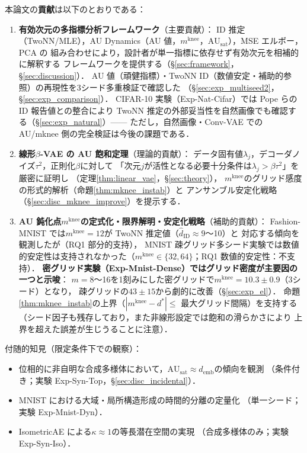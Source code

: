 \documentclass[11pt,a4paper]{jsarticle}
\newcommand{\kap}{\kappa}
\newcommand{\AUsat}{\mathrm{AU}_{\mathrm{sat}}}
\newcommand{\mknee}{m^{\mathrm{knee}}}
\newcommand{\demb}{d_{\mathrm{emb}}}
\begin{document}
本論文の\textbf{貢献}は以下のとおりである：
\begin{enumerate}
  \item \textbf{有効次元の多指標分析フレームワーク}（主要貢献）：
        ID 推定（TwoNN/MLE），AU Dynamics（AU 値，$\mknee$，$\AUsat$），MSE エルボー，PCA の
        組み合わせにより，設計者が単一指標に依存せず有効次元を相補的に解釈する
        フレームワークを提供する（§\ref{sec:framework}，§\ref{sec:discussion}）．
        AU 値（頑健指標）・TwoNN ID（数値安定・補助的参照）の再現性を3シード多重検証で確認した
        （§\ref{sec:exp_multiseed2}，§\ref{sec:exp_comparison}）．
        CIFAR-10 実験（Exp-Nat-Cifar）では Pope ら\cite{pope2021intrinsic}の ID 報告値との整合により
        TwoNN 推定の外部妥当性を自然画像でも確認する（§\ref{sec:exp_natural}）——
        ただし，自然画像・Conv-VAE での AU/mknee 側の完全検証は今後の課題である．
  \item \textbf{線形$\beta$-VAE の AU 飽和定理}（理論的貢献）：
        データ固有値$\lambda_j$，デコーダノイズ$\tau^2$，正則化$\beta$に対して
        「次元$j$が活性となる必要十分条件は$\lambda_j > \beta\tau^2$」を厳密に証明し
        （定理\ref{thm:linear_vae}，§\ref{sec:theory}），
        $\mknee$のグリッド感度の形式的解析（命題\ref{thm:mknee_instab}）と
        アンサンブル安定化戦略（§\ref{sec:disc_mknee_improve}）を提示する．
  \item \textbf{AU 鈍化点$\mknee$の定式化・限界解明・安定化戦略}（補助的貢献）：
        Fashion-MNIST では$\mknee = 12$が TwoNN 推定値（$\hat{d}_\mathrm{ID} \approx 9$〜10）と
        対応する傾向を観測したが（RQ1 部分的支持），
        MNIST 疎グリッド多シード実験では数値的安定性は支持されなかった（$\mknee \in \{32,64\}$；RQ1 数値的安定性：不支持）．
        \textbf{密グリッド実験（Exp-Mnist-Dense）ではグリッド密度が主要因の一つと示唆}：
        $m=8$〜16を1刻みにした密グリッドで$\mknee = 10.3 \pm 0.9$（3シード）となり，
        疎グリッドの$43 \pm 15$から劇的に改善（§\ref{sec:exp_el}）．
        命題\ref{thm:mknee_instab}の上界（$|\mknee - d^*| \leq$ 最大グリッド間隔）を支持する
        （シード因子も残存しており，また非線形設定では飽和の滑らかさにより
        上界を超えた誤差が生じうることに注意）．
\end{enumerate}

付随的知見（限定条件下での観察）：
\begin{itemize}
  \item 位相的に非自明な合成多様体において，$\AUsat \approx \demb$の傾向を観測
        （条件付き；実験 Exp-Syn-Top，§\ref{sec:disc_incidental}）．
  \item MNIST における大域・局所構造形成の時間的分離の定量化
        （単一シード；実験 Exp-Mnist-Dyn）．
  \item IsometricAE による$\kap \approx 1$の等長潜在空間の実現
        （合成多様体のみ；実験 Exp-Syn-Iso）．
\end{itemize}
\end{document}

